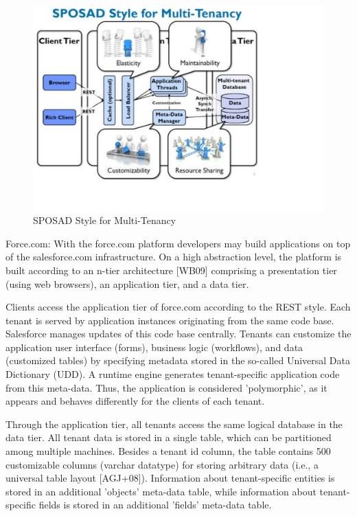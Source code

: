 \begin{figure}[h]
\centering
\includegraphics{patterns/Multi-tenantApplicationDiagram-02.pdf}
\caption{SPOSAD Style for Multi-Tenancy}
\label{fig:Multi-tenantApplicationDiagram-02}
\end{figure}

Force.com: With the force.com platform developers may build applications on top of the salesforce.com infrastructure. On a high abstraction level, the platform is built according to an n-tier architecture [WB09] comprising a presentation tier (using web browsers), an application tier, and a data tier.

Clients access the application tier of force.com according to the REST style. Each tenant is served by application instances originating from the same code base. Salesforce manages updates of this code base centrally. Tenants can customize the application user interface
(forms), business logic (workflows), and data (customized tables) by specifying metadata stored in the so-called Universal Data Dictionary (UDD). A runtime engine generates tenant-specific application code from this meta-data. Thus, the application is considered 'polymorphic', as it appears and behaves differently for the clients of each tenant.

Through the application tier, all tenants access the same logical database in the data tier. All tenant data is stored in a single table, which can be partitioned among multiple machines. Besides a tenant id column, the table contains 500 customizable columns (varchar
datatype) for storing arbitrary data (i.e., a universal table layout [AGJ+08]). Information about tenant-specific entities is stored in an additional 'objects' meta-data table, while information about tenant-specific fields is stored in an additional 'fields' meta-data table.

